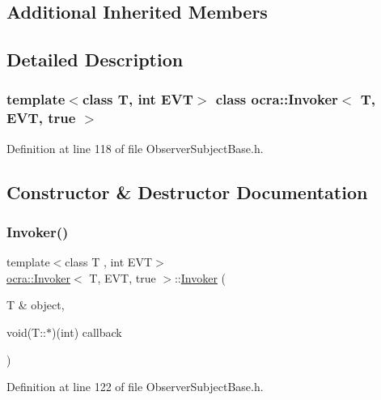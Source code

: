 \subsection*{Additional Inherited Members}


\subsection{Detailed Description}
\subsubsection*{template$<$class T, int E\+VT$>$\newline
class ocra\+::\+Invoker$<$ T, E\+V\+T, true $>$}



Definition at line 118 of file Observer\+Subject\+Base.\+h.



\subsection{Constructor \& Destructor Documentation}
\hypertarget{classocra_1_1Invoker_3_01T_00_01EVT_00_01true_01_4_afba0606d59375568cb88fe02023c962e}{}\label{classocra_1_1Invoker_3_01T_00_01EVT_00_01true_01_4_afba0606d59375568cb88fe02023c962e} 
\subsubsection{\texorpdfstring{Invoker()}{Invoker()}}
{\footnotesize\ttfamily template$<$class T , int E\+VT$>$ \\
\hyperlink{classocra_1_1Invoker}{ocra\+::\+Invoker}$<$ T, E\+VT, true $>$\+::\hyperlink{classocra_1_1Invoker}{Invoker} (\begin{DoxyParamCaption}\item[{T \&}]{object,  }\item[{void(T\+::$\ast$)(int)}]{callback }\end{DoxyParamCaption})\hspace{0.3cm}{\ttfamily [inline]}}



Definition at line 122 of file Observer\+Subject\+Base.\+h.



